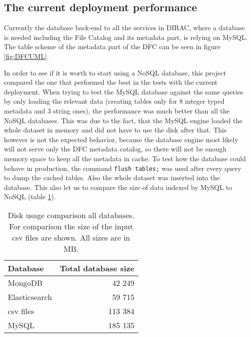 \subsection{The current deployment performance}

Currently the database back-end to all the services in DIRAC, where a database is needed including the File Catalog
and its metadata part, is relying on MySQL. The table scheme of the metadata part of the DFC can be seen in figure
\ref{fig:DFCUML}.


In order to see if it is worth to start using a NoSQL database, this project compared the one that performed 
the best in the tests with the current deployment. When trying to test the MySQL database against the same queries 
by only loading the relevant data (creating tables only for 8 integer typed metadata and 3 string ones), the 
performance was much better than all the NoSQL databases. This was due to the fact, that the MySQL engine loaded
the whole dataset in memory and did not have to use the disk after that. This however is not the expected 
behavior, because the database engine most likely will not serve only the DFC metadata catalog, so there will not
be enough memory space to keep all the metadata in cache. To test how the database could behave in production, the 
command \texttt{flush tables;} was used after every query to dump the cached tables. Also the whole dataset
was inserted into the database. This also let us to compare the size of data indexed by MySQL to NoSQL (table 
\ref{tab:allDbSizes}). 

\begin{table}[h]
\centering
\begin{tabular}{|l|r|}
\hline
Database      & \multicolumn{1}{l|}{Total database size} \\ \hline
MongoDB       & 42 249                                   \\ \hline
Elasticsearch & 59 715                                   \\ \hline
csv files     & 113 384                                  \\ \hline
MySQL         & 185 135                                  \\ \hline
\end{tabular}
\caption{Disk usage comparison all databases. For comparison the size of the input csv files are shown. All sizes 
are in MB.}
\label{tab:allDbSizes}
\end{table}

